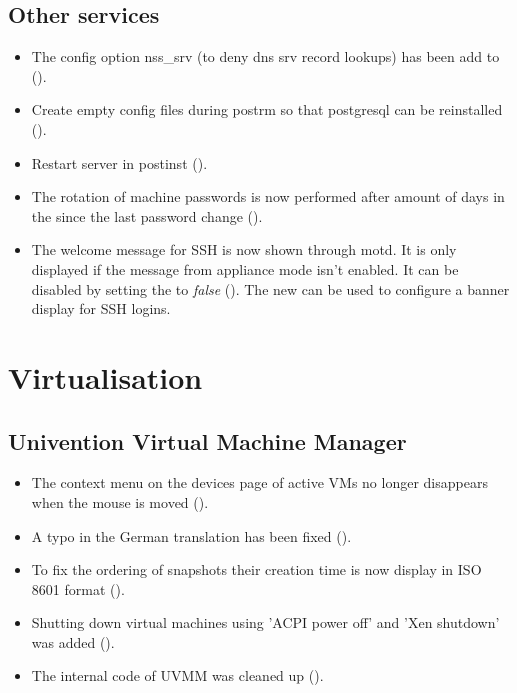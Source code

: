 \subsection{Other services}
\begin{itemize}

\item The config option nss\_srv (to deny dns srv record lookups) has
been add to  ().

\item Create empty  config files during postrm so that
postgresql can be reinstalled ().

\item Restart  server in postinst ().

\item The rotation of machine passwords is now performed after amount of days
in the  since the last password change
().

\item The welcome message for SSH is now shown through motd. It is
  only displayed if the message from appliance mode isn't enabled. It
  can be disabled by setting the  to \emph{false}
(). The new  can be used to
  configure a banner display for SSH logins.

\end{itemize}


\section{Virtualisation}


\subsection{Univention Virtual Machine Manager}
\begin{itemize}
\item The context menu on the devices page of active VMs no longer disappears when the mouse is moved ().
\item A typo in the German translation has been fixed ().
\item To fix the ordering of snapshots their creation time is now display in ISO 8601 format ().
\item Shutting down virtual machines using 'ACPI power off' and 'Xen shutdown' was added ().
\item The internal code of UVMM was cleaned up ().
\end{itemize}

